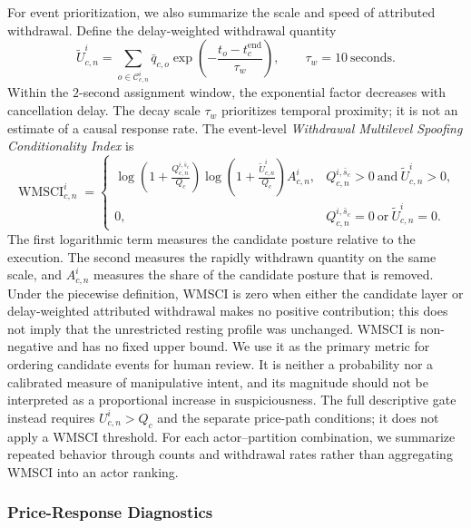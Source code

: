 \documentclass[11pt]{article}
\begin{document}
For event prioritization, we also summarize the scale and speed of attributed withdrawal. Define the delay-weighted withdrawal quantity
\begin{equation}
    \widetilde U^{i}_{c,n}
    =
    \sum_{o\in\mathcal{C}_{c,n}^{i}}
    \bar q_{c,o}\exp\!\left(-\frac{t_o-t_c^{\mathrm{end}}}{\tau_w}\right),
    \qquad \tau_w=10\ \text{seconds}.
    \label{eq:delay_weighted_withdrawal}
\end{equation}
Within the $2$-second assignment window, the exponential factor decreases with cancellation delay. The decay scale
$\tau_w$ prioritizes temporal proximity; it is not an estimate of a causal response rate.
The event-level \textit{Withdrawal Multilevel Spoofing Conditionality Index} is
\begin{equation}
    \operatorname{WMSCI}^{i}_{c,n}
    =
    \begin{cases}
    \displaystyle
    \log\!\left(1+\frac{Q^{i,\bar{s}_c}_{c,n}}{Q_c}\right)
    \log\!\left(1+\frac{\widetilde U^{i}_{c,n}}{Q_c}\right)
    A^{i}_{c,n},
    & Q^{i,\bar{s}_c}_{c,n}>0\ \text{and}\ \widetilde U^{i}_{c,n}>0,\\[5pt]
    0,
    & Q^{i,\bar{s}_c}_{c,n}=0\ \text{or}\ \widetilde U^{i}_{c,n}=0.
    \end{cases}
    \label{eq:wmsci}
\end{equation}
The first logarithmic term measures the candidate posture relative to the execution. The second measures the
rapidly withdrawn quantity on the same scale, and $A^{i}_{c,n}$ measures the share of the candidate posture that is removed.
Under the piecewise definition, WMSCI is zero when either the candidate layer or delay-weighted attributed withdrawal makes
no positive contribution; this does not imply that the unrestricted resting profile was unchanged. WMSCI is non-negative
and has no fixed upper bound. We use it as the primary metric for ordering candidate events for
human review. It is neither a probability nor a calibrated measure of manipulative intent, and its magnitude should not be
interpreted as a proportional increase in suspiciousness. The full descriptive gate instead requires
$U^{i}_{c,n}>Q_c$ and the separate price-path conditions; it does not apply a WMSCI threshold. For each actor--partition combination,
we summarize repeated behavior through counts and withdrawal rates rather than aggregating WMSCI into an actor ranking.

\subsubsection{Price-Response Diagnostics}
\label{subsec:price_response_diagnostics}
\end{document}
